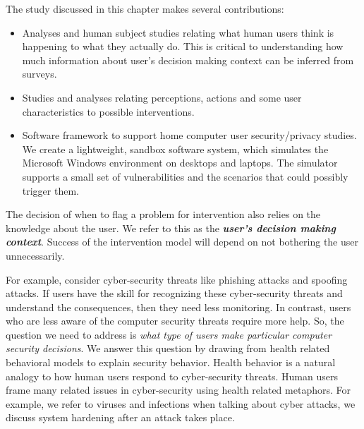 The study discussed in this chapter makes several contributions:
\begin{itemize}
\item Analyses and human subject studies relating what human users think is happening to what they actually do. This is critical to understanding how much information about user's decision making context can be inferred from surveys.
\item Studies and analyses relating perceptions, actions and some user characteristics to possible interventions.
\item Software framework to support home computer user security/privacy studies. We create a lightweight, sandbox software system, which simulates the Microsoft Windows environment on desktops and laptops. The simulator supports a small set of vulnerabilities and the scenarios that could possibly trigger them.
\end{itemize}

The decision of when to flag a problem for intervention also relies on the knowledge about the user. 
We refer to this as the \textbf{\textit{user's decision making context}}. 
Success of the intervention model will depend on not bothering the user unnecessarily. 

For example, consider cyber-security threats like phishing attacks and spoofing attacks.
If users have the skill for recognizing these cyber-security threats and understand the consequences, then they need less monitoring.
In contrast, users who are less aware of the computer security threats require more help. 
So, the question we need to address is \textit{what type of users make particular computer security decisions}. 
We answer this question by drawing from health related behavioral models to explain security behavior. 
Health behavior is a natural analogy to how human users respond to cyber-security threats. 
Human users frame many related issues in cyber-security using health related metaphors. 
For example, we refer to viruses and infections when talking about cyber attacks, we discuss system hardening after an attack takes place. 

